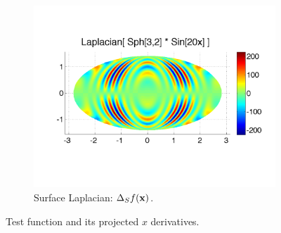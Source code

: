\begin{figure}[htbp]
	\begin{subfigure}[b]{0.425\textwidth}
	\includegraphics[width=1.0\textwidth]{figures/chapter2/compare_weight_generation/lsfc_vs_px_grad_dot_px_grad/lsfc_sph32_times_sin20x.pdf}
	\caption{Surface Laplacian: $\Delta_S f(\mathbf{x})$.  }
	\end{subfigure}
	\caption{Test function and its projected $x$ derivatives. }
\end{figure}


